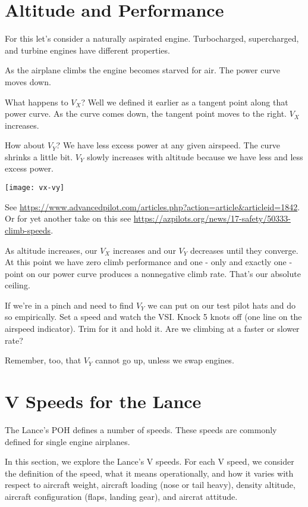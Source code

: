 \section{Altitude and Performance}

For this let's consider a naturally aspirated engine. Turbocharged, supercharged, and turbine engines have different properties.

As the airplane climbs the engine becomes starved for air. The power curve moves down.

What happens to $V_X$? Well we defined it earlier as a tangent point along that power curve. As the curve comes down, the tangent point moves to the right. $V_X$ increases.

How about $V_Y$? We have less excess power at any given airspeed. The curve shrinks a little bit. $V_Y$ slowly increases with altitude because we have less and less excess power.

\texttt{[image: vx-vy]}

See \url{https://www.advancedpilot.com/articles.php?action=article&articleid=1842}. Or for yet another take on this see \url{https://azpilots.org/news/17-safety/50333-climb-speeds}.

As altitude increases, our $V_X$ increases and our $V_Y$ decreases until they converge. At this point we have zero climb performance and one - only and exactly one - point on our power curve produces a nonnegative climb rate. That's our absolute ceiling.

If we're in a pinch and need to find $V_Y$ we can put on our test pilot hats and do so empirically. Set a speed and watch the VSI. Knock 5 knots off (one line on the airspeed indicator). Trim for it and hold it. Are we climbing at a faster or slower rate?

Remember, too, that $V_Y$ cannot go up, unless we swap engines.

\section{V Speeds for the Lance}

The Lance's POH defines a number of speeds. These speeds are commonly defined for single engine airplanes.

In this section, we explore the Lance's V speeds. For each V speed, we consider the definition of the speed, what it means operationally, and how it varies with respect to aircraft weight, aircraft loading (nose or tail heavy), density altitude, aircraft configuration (flaps, landing gear), and aircrat attitude.

